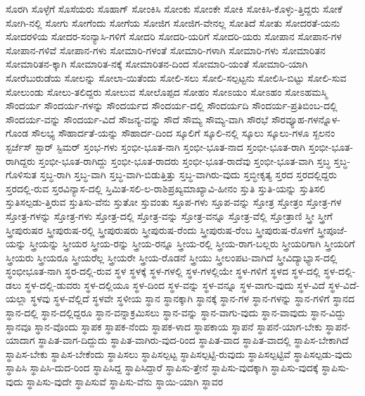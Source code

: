 {ಸೊರಗಿ
ಸೊಳ್ಳೆಗೆ
ಸೊಸೆಯರು
ಸೊಹಾಗ್
ಸೋಂಕಿಸಿ
ಸೋಂಕು
ಸೋಂಕೇ
ಸೋಕಿ
ಸೋಕಿಸಿ-ಕೊಳ್ಳು-ತ್ತಿದ್ದರು
ಸೋಕೆ
ಸೋಗಿ-ನಲ್ಲಿ
ಸೋಗು
ಸೋಗೆಂದು
ಸೋಗೆಯ
ಸೋಜಿಗ
ಸೋಜಿಗ-ವೇನಲ್ಲ
ಸೋತಿದೆ
ಸೋತು
ಸೋದರತೆ-ಯನು
ಸೋದರಳಿಯ
ಸೋದರ-ಸಂನ್ಯಾಸಿ-ಗಳಿಗೆ
ಸೋದರಿ
ಸೋದರಿ-ಯರಿಗೆ
ಸೋದರಿ-ಯರು
ಸೋಪಾನ
ಸೋಪಾನ-ಗಳ
ಸೋಪಾನ-ಗಳಿವೆ
ಸೋಪಾನ-ಗಳು
ಸೋಮಾರಿ-ಗಳಂತೆ
ಸೋಮಾರಿ-ಗಳಾಗಿ
ಸೋಮಾರಿ-ಗಳು
ಸೋಮಾರಿತನ
ಸೋಮಾರಿತನ-ಕ್ಕಾಗಿ
ಸೋಮಾರಿತ-ನಕ್ಕೆ
ಸೋಮಾರಿತನ-ದಿಂದ
ಸೋಮಾರಿ-ಯಂತೆ
ಸೋಮಾರಿ-ಯಾಗಿ
ಸೋರೆಬುರುಡೆಯ
ಸೋಲನ್ನು
ಸೋಲಾ-ಯಿತೆಂದು
ಸೋಲಿ-ಸಲು
ಸೋಲಿ-ಸಲ್ಪಟ್ಟನು
ಸೋಲಿಸಿ-ಬಿಟ್ಟು
ಸೋಲಿ-ಸುವ
ಸೋಲುಂಡು
ಸೋಲು-ತಲಿದ್ದರು
ಸೋಲುವ
ಸೋಲೊಪ್ಪದ
ಸೋಹಂ
ಸೋಽಯಂ
ಸೋಽಹಂ
ಸೋಽಹಮಸ್ಮಿ
ಸೌಂದರ್ಯ
ಸೌಂದರ್ಯ-ಗಳನ್ನು
ಸೌಂದರ್ಯದ
ಸೌಂದರ್ಯ-ದಲ್ಲಿ
ಸೌಂದರ್ಯದಿ
ಸೌಂದರ್ಯ-ಪ್ರತಿಬಿಂಬ-ದಲ್ಲಿ
ಸೌಂದರ್ಯ-ವನ್ನು
ಸೌಂದರ್ಯ-ವಿದೆ
ಸೌಜನ್ಯ-ವನ್ನು
ಸೌದೆ
ಸೌಮ್ಯ
ಸೌಮ್ಯ-ವಾಗಿ
ಸೌರಭೆ
ಸೌರವ್ಯೂಹ-ಗಳನ್ನೊಳ-ಗೊಂಡ
ಸೌಲಭ್ಯ
ಸೌಹಾರ್ದತೆ-ಯನ್ನು
ಸೌಹಾರ್ದ-ದಿಂದ
ಸ್ಕೂಲಿಗೆ
ಸ್ಕೂಲಿ-ನಲ್ಲಿ
ಸ್ಕೂಲು
ಸ್ಕೂಲು-ಗಳೂ
ಸ್ಖಲನಂ
ಸ್ಟರ್ಜೆಸ್
ಸ್ಟಾರ್
ಸ್ಟಿಮರ್
ಸ್ತಂಭ-ಗಳು
ಸ್ತಂಭೀ-ಭೂತ-ನಾಗಿ
ಸ್ತಂಭೀ-ಭೂತ-ನಾದ
ಸ್ತಂಭೀ-ಭೂತ-ರಾಗಿ
ಸ್ತಂಭೀ-ಭೂತ-ರಾಗಿದ್ದರು
ಸ್ತಂಭೀ-ಭೂತ-ರಾಗಿದ್ದು
ಸ್ತಂಭೀ-ಭೂತ-ರಾದರು
ಸ್ತಂಭೀ-ಭೂತ-ರಾದೆವು
ಸ್ತಂಭೀ-ಭೂತ-ವಾಗಿ
ಸ್ತಬ್ಧ
ಸ್ತಬ್ಧ-ಗೊಳಿಸುತ
ಸ್ತಬ್ಧ-ರಾಗಿ
ಸ್ತಬ್ಧ-ವಾಗಿ
ಸ್ತಬ್ಧ-ವಾಗಿ-ಬಿಡುತ್ತಿತ್ತು
ಸ್ತಬ್ಧ-ವಾಗಿರು-ವುದು
ಸ್ತಬ್ಧೀಕೃತ್ಯ
ಸ್ತರದ
ಸ್ತರದಲ್ಲಿದ್ದರು
ಸ್ತರದಲ್ಲಿ-ರುವ
ಸ್ತರವಿನ್ಯಾಸ-ದಲ್ಲಿ
ಸ್ತಿಮಿತ-ಸಲಿ-ಲ-ರಾಶಿಪ್ರಖ್ಯಮಾಖ್ಯಾವಿ-ಹೀನಂ
ಸ್ತುತಿ
ಸ್ತುತಿ-ಯನ್ನು
ಸ್ತುತಿಸಲಿ
ಸ್ತುತಿಸಲ್ಪಡು-ತ್ತಿರುವ
ಸ್ತುತಿಸು-ವೆನು
ಸ್ತುತೋ
ಸ್ತುವಂತು
ಸ್ತೂಪ-ಗಳು
ಸ್ತೂಪ-ವನ್ನು
ಸ್ತೋತ್ರ
ಸ್ತೋತ್ರಂ
ಸ್ತೋತ್ರ-ಗಳ
ಸ್ತೋತ್ರ-ಗಳನ್ನು
ಸ್ತೋತ್ರ-ಗಳು
ಸ್ತೋತ್ರ-ದಲ್ಲಿ
ಸ್ತೋತ್ರ-ವನ್ನು
ಸ್ತೋತ್ರ-ವನ್ನೂ
ಸ್ತೋತ್ರ-ವೆಲ್ಲಿ
ಸ್ತೋತ್ರಾಣಿ
ಸ್ತ್ರೀ
ಸ್ತ್ರೀಗೆ
ಸ್ತ್ರೀಪುರುಷರ
ಸ್ತ್ರೀಪುರುಷ-ರಲ್ಲಿ
ಸ್ತ್ರೀಪುರುಷರು
ಸ್ತ್ರೀಪುರುಷ-ರೆಂದು
ಸ್ತ್ರೀಪುರುಷ-ರೆಂಬ
ಸ್ತ್ರೀಪುರುಷ-ರೊಳಗೆ
ಸ್ತ್ರೀಪೂಜೆ-ಯನ್ನು
ಸ್ತ್ರೀಯನ್ನು
ಸ್ತ್ರೀಯರ
ಸ್ತ್ರೀಯ-ರನ್ನು
ಸ್ತ್ರೀಯ-ರನ್ನೂ
ಸ್ತ್ರೀಯ-ರಲ್ಲಿ
ಸ್ತ್ರೀಯ-ರಾಗ-ಬಲ್ಲರು
ಸ್ತ್ರೀಯರಿಗಾಗಿ
ಸ್ತ್ರೀಯರಿಗೆ
ಸ್ತ್ರೀಯರು
ಸ್ತ್ರೀಯರೂ
ಸ್ತ್ರೀಯರೆಲ್ಲ
ಸ್ತ್ರೀಯರೇ
ಸ್ತ್ರೀಯ-ರೊಡನೆ
ಸ್ತ್ರೀಯು
ಸ್ತ್ರೀಲಂಪಟ-ವಾಗಿದೆ
ಸ್ತ್ರೀವಿದ್ಯಾಭ್ಯಾಸ-ದಲ್ಲಿ
ಸ್ಥಂಭೀಭೂತ-ನಾಗಿ
ಸ್ಥರ-ದಲ್ಲಿ-ರುವ
ಸ್ಥಳ
ಸ್ಥಳಕ್ಕೆ
ಸ್ಥಳ-ಗಳಲ್ಲಿ
ಸ್ಥಳ-ಗಳಲ್ಲಿಯೇ
ಸ್ಥಳ-ಗಳಿಗೆ
ಸ್ಥಳದ
ಸ್ಥಳ-ದಲ್ಲಿ
ಸ್ಥಳ-ದಲ್ಲಿ-ಡಲು
ಸ್ಥಳ-ದಲ್ಲಿ-ಡುವರು
ಸ್ಥಳ-ದಲ್ಲಿಯೂ
ಸ್ಥಳ-ದಿಂದ
ಸ್ಥಳ-ವನ್ನು
ಸ್ಥಳ-ವನ್ನೂ
ಸ್ಥಳ-ವಾಗು-ವುದು
ಸ್ಥಳ-ವಿದೆ
ಸ್ಥಳ-ವಿದೆ-ಯಲ್ಲಾ
ಸ್ಥಳವು
ಸ್ಥಳ-ವೆಲ್ಲಿದೆ
ಸ್ಥಳವೇ
ಸ್ಥಳೀಯ
ಸ್ಥಾನ
ಸ್ಥಾನಕ್ಕಾಗಿ
ಸ್ಥಾನಕ್ಕೆ
ಸ್ಥಾನ-ಗಳ
ಸ್ಥಾನ-ಗಳನ್ನು
ಸ್ಥಾನ-ಗಳಿಗೆ
ಸ್ಥಾನದ
ಸ್ಥಾನ-ದಲ್ಲಿ
ಸ್ಥಾನ-ದಲ್ಲಿದ್ದರೂ
ಸ್ಥಾನ-ವನ್ನಾಕ್ರಮಿಸಲು
ಸ್ಥಾನ-ವನ್ನು
ಸ್ಥಾನ-ವಾಗು-ವುದು
ಸ್ಥಾನ-ವಾವುದು
ಸ್ಥಾನ-ವಿದ್ದು
ಸ್ಥಾನವೂ
ಸ್ಥಾನ-ವೊಂದು
ಸ್ಥಾಪಕ
ಸ್ಥಾಪಕ-ನೆಂದು
ಸ್ಥಾಪಕ-ಳಾದ
ಸ್ಥಾಪಕಾಯ
ಸ್ಥಾಪನೆ
ಸ್ಥಾಪನೆ-ಯಾಗ-ಬೇಕು
ಸ್ಥಾಪನೆ-ಯಾದಾಗ
ಸ್ಥಾಪಿತ-ವಾಗ-ದಿದ್ದುದು
ಸ್ಥಾಪಿತ-ವಾಗಿರು-ವುದ-ರಿಂದ
ಸ್ಥಾಪಿತ-ವಾದ
ಸ್ಥಾಪಿತ-ವಾದಲ್ಲಿ
ಸ್ಥಾಪಿಸ-ಬೇಕಾಗಿದೆ
ಸ್ಥಾಪಿಸ-ಬೇಕು
ಸ್ಥಾಪಿಸ-ಬೇಕೆಂದು
ಸ್ಥಾಪಿಸಲು
ಸ್ಥಾಪಿಸಲ್ಪಟ್ಟ
ಸ್ಥಾಪಿಸಲ್ಪಟ್ಟಿ-ರುವುದು
ಸ್ಥಾಪಿಸಲ್ಪಟ್ಟಿವೆ
ಸ್ಥಾಪಿಸಲ್ಪಡು-ವುದು
ಸ್ಥಾಪಿಸಿ
ಸ್ಥಾಪಿಸಿ-ದುದ-ರಿಂದ
ಸ್ಥಾಪಿಸಿದ್ದ
ಸ್ಥಾಪಿಸಿದ್ದಾರೆ
ಸ್ಥಾಪಿಸು-ತ್ತೇನೆ
ಸ್ಥಾಪಿಸು-ವುದಕ್ಕಾಗಿ
ಸ್ಥಾಪಿಸು-ವುದಕ್ಕೆ
ಸ್ಥಾಪಿಸು-ವುದು
ಸ್ಥಾಪಿಸು-ವುದೇ
ಸ್ಥಾಪಿಸುವೆ
ಸ್ಥಾಪಿಸು-ವೆನು
ಸ್ಥಾಯಿ-ಯಾಗಿ
ಸ್ಥಾವರ
}
